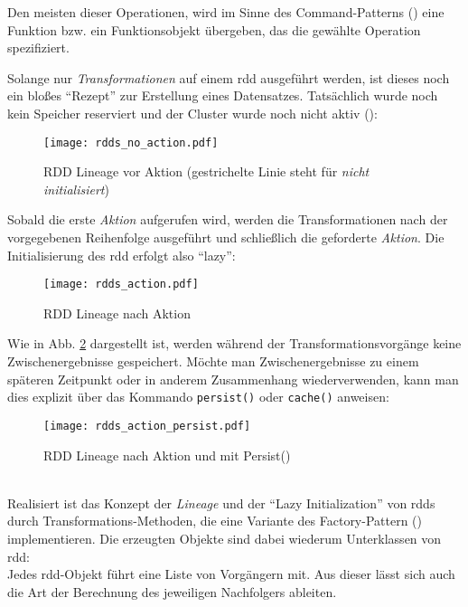 Den meisten dieser Operationen, wird im Sinne des Command-Patterns (\cite{FPP13}) eine Funktion bzw. ein Funktionsobjekt übergeben, das die gewählte Operation spezifiziert.

Solange nur \textit{Transformationen} auf einem \gls{rdd} ausgeführt werden, ist dieses noch ein bloßes "`Rezept"' zur Erstellung eines Datensatzes. Tatsächlich wurde noch kein Speicher reserviert und der Cluster wurde noch nicht aktiv (\cite{Mat12}):\\

\begin{figure}[ht!]
	\centering
  \texttt{[image: rdds\_no\_action.pdf]}
	\caption{RDD Lineage vor Aktion (gestrichelte Linie steht für \textit{nicht initialisiert})}
	\label{fig:rdds_no_action}
\end{figure}

Sobald die erste \textit{Aktion} aufgerufen wird, werden die Transformationen nach der vorgegebenen Reihenfolge ausgeführt und schließlich die geforderte \textit{Aktion}. Die Initialisierung des \gls{rdd} erfolgt also "`lazy"':\\

\begin{figure}[ht!]
	\centering
  \texttt{[image: rdds\_action.pdf]}
	\caption{RDD Lineage nach Aktion}
	\label{fig:rdds_action}
\end{figure}

Wie in Abb. \ref{fig:rdds_action} dargestellt ist, werden während der Transformationsvorgänge keine Zwischenergebnisse gespeichert. Möchte man Zwischenergebnisse zu einem späteren Zeitpunkt oder in anderem Zusammenhang wiederverwenden, kann man dies explizit über das Kommando \lstinline|persist()| oder \lstinline|cache()| anweisen:\\

\begin{figure}[ht!]
	\centering
  \texttt{[image: rdds\_action\_persist.pdf]}
	\caption{RDD Lineage nach Aktion und mit Persist()}
	\label{fig:rdds_action_persist}
\end{figure}
\\
Realisiert ist das Konzept der \textit{Lineage} und der "`Lazy Initialization"' von \glspl{rdd} durch Transformations-Methoden, die eine Variante des Factory-Pattern (\cite{FPP13}) implementieren. Die erzeugten Objekte sind dabei wiederum Unterklassen von \gls{rdd}:\\
Jedes \gls{rdd}-Objekt führt eine Liste von Vorgängern mit. Aus dieser lässt sich auch die Art der Berechnung des jeweiligen Nachfolgers ableiten.\\

